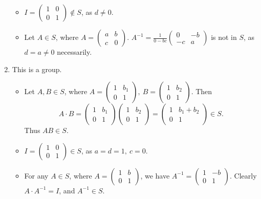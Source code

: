 \documentclass{homework}
\begin{document}
\begin{solution}
\begin{enumerate}[label=(\alph*)]
\begin{itemize}
            \item $I=\begin{pmatrix} 1&0\\0&1 \end{pmatrix} \not\in S$, as $d\neq 0$.
            \item Let $A\in S$, where $A=\begin{pmatrix} a&b\\c&0 \end{pmatrix} $.
              $A^{-1}=\frac{1}{0-bc}\begin{pmatrix} 0&-b\\-c&a \end{pmatrix}$ is not in $S$, as
              $d=a\neq 0$ necessarily.
      \end{itemize}
    \item This is a group.
      \begin{itemize}
        \item Let $A,B\in S$, where $A=\begin{pmatrix} 1&b_1\\0&1 \end{pmatrix},\ B=\begin{pmatrix}
        1&b_2\\0&1 \end{pmatrix} $. Then \[
          A\cdot B= \begin{pmatrix} 1&b_1\\0&1 \end{pmatrix}\begin{pmatrix} 1&b_2\\0&1 \end{pmatrix}
          =\begin{pmatrix} 1&b_1+b_2\\0&1 \end{pmatrix} \in S  
        .\] Thus $AB\in S$.
        \item $I=\begin{pmatrix} 1&0\\0&1 \end{pmatrix} \in S$, as $a=d=1,\ c=0$.
        \item For any  $A\in S$, where $A=\begin{pmatrix} 1&b\\0&1 \end{pmatrix} $, we have
          $A^{-1}=\begin{pmatrix} 1&-b\\0&1 \end{pmatrix} $. Clearly $A\cdot A^{-1}=I$, and
          $A^{-1}\in S$.
      \end{itemize}
  \end{enumerate}
\end{solution}
\end{document}

